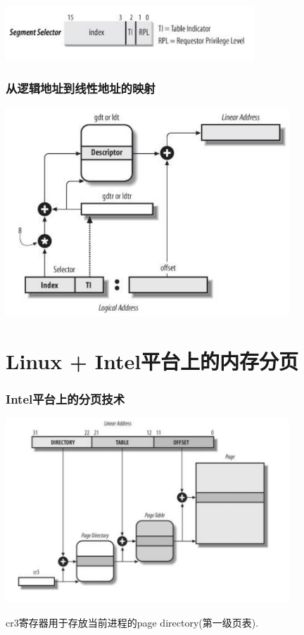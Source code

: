 \documentclass[xcolor=svgnames]{beamer}
\begin{document}
\begin{CJK*}{UTF8}{gbsn}
\begin{frame}[fragile]
\includegraphics[width=0.7\textwidth]{selector.png}
\end{frame}

\begin{frame}[fragile]
\frametitle{从逻辑地址到线性地址的映射}
\includegraphics[width=0.8\textwidth]{segunit.png}
\end{frame}

\section{Linux + Intel平台上的内存分页}

\begin{frame}[fragile]
\frametitle{Intel平台上的分页技术}
\includegraphics[width=0.8\textwidth]{regpaging.png}

cr3寄存器用于存放当前进程的page directory(第一级页表).
\end{frame}


\end{CJK*}
\end{document}

